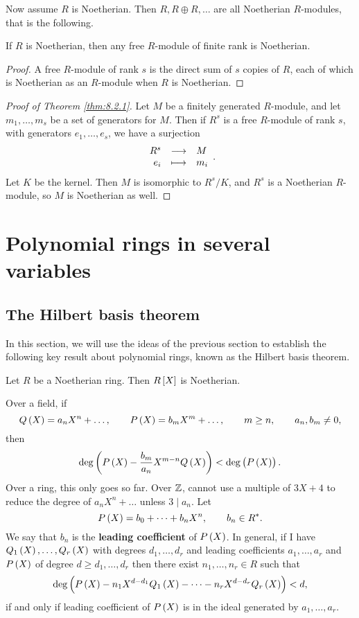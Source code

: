 Now assume $ R $ is Noetherian. Then $ R, R \oplus R, \dots $ are all Noetherian $ R $-modules, that is the following.

\begin{corollary}
If $ R $ is Noetherian, then any free $ R $-module of finite rank is Noetherian.
\end{corollary}

\begin{proof}
A free $ R $-module of rank $ s $ is the direct sum of $ s $ copies of $ R $, each of which is Noetherian as an $ R $-module when $ R $ is Noetherian.
\end{proof}

\begin{proof}[Proof of Theorem \ref{thm:8.2.1}]
Let $ M $ be a finitely generated $ R $-module, and let $ m_1, \dots, m_s $ be a set of generators for $ M $. Then if $ R^s $ is a free $ R $-module of rank $ s $, with generators $ e_1, \dots, e_s $, we have a surjection
$$ \function{R^s}{M}{e_i}{m_i}. $$
Let $ K $ be the kernel. Then $ M $ is isomorphic to $ R^s / K $, and $ R^s $ is a Noetherian $ R $-module, so $ M $ is Noetherian as well.
\end{proof}

\pagebreak

\section{Polynomial rings in several variables}

\subsection{The Hilbert basis theorem}

In this section, we will use the ideas of the previous section to establish the following key result about polynomial rings, known as the Hilbert basis theorem.

\begin{theorem}
\label{thm:9.1.1}
Let $ R $ be a Noetherian ring. Then $ R\sbr{X} $ is Noetherian.
\end{theorem}


Over a field, if
$$ Q\br{X} = a_nX^n + \dots, \qquad P\br{X} = b_mX^m + \dots, \qquad m \ge n, \qquad a_n, b_m \ne 0, $$
then
$$ \deg\br{P\br{X} - \dfrac{b_m}{a_n}X^{m - n}Q\br{X}} < \deg\br{P\br{X}}. $$
Over a ring, this only goes so far. Over $ \mathbb{Z} $, cannot use a multiple of $ 3X + 4 $ to reduce the degree of $ a_nX^n + \dots $ unless $ 3 \mid a_n $. Let
$$ P\br{X} = b_0 + \dots + b_nX^n, \qquad b_n \in R^*. $$
We say that $ b_n $ is the \textbf{leading coefficient} of $ P\br{X} $. In general, if I have $ Q_1\br{X}, \dots, Q_r\br{X} $ with degrees $ d_1, \dots, d_r $ and leading coefficients $ a_1, \dots, a_r $ and $ P\br{X} $ of degree $ d \ge d_1, \dots, d_r $ then there exist $ n_1, \dots, n_r \in R $ such that
$$ \deg\br{P\br{X} - n_1X^{d - d_1}Q_1\br{X} - \dots - n_rX^{d - d_r}Q_r\br{X}} < d, $$
if and only if leading coefficient of $ P\br{X} $ is in the ideal generated by $ a_1, \dots, a_r $.

